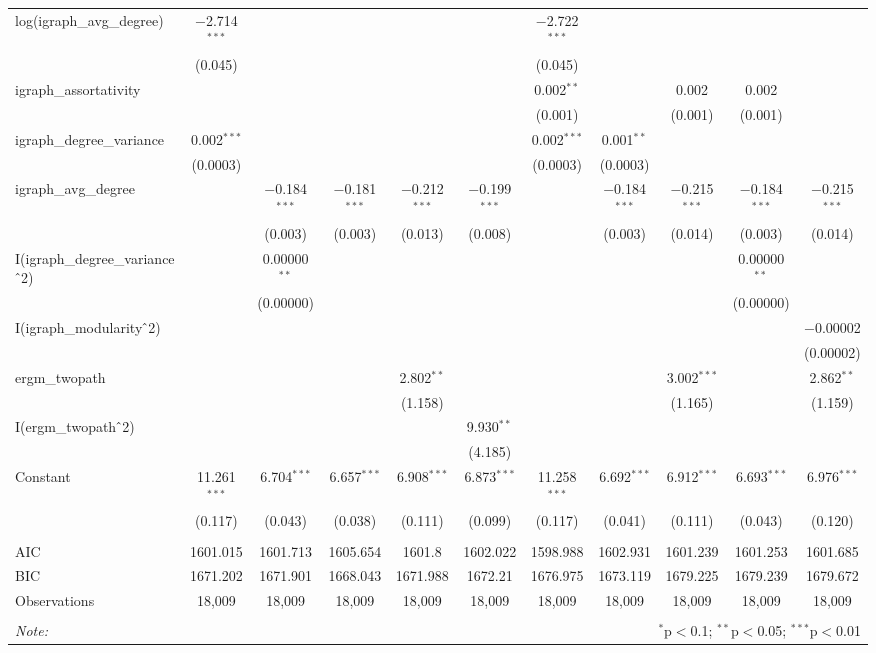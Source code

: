 \begin{table}[!htbp]
\begin{tabular}{@{\extracolsep{5pt}}lcccccccccc}
  log(igraph\_avg\_degree) & $-$2.714$^{***}$ &  &  &  &  & $-$2.722$^{***}$ &  &  &  &  \\ 
  & (0.045) &  &  &  &  & (0.045) &  &  &  &  \\ 
  igraph\_assortativity &  &  &  &  &  & 0.002$^{**}$ &  & 0.002 & 0.002 &  \\ 
  &  &  &  &  &  & (0.001) &  & (0.001) & (0.001) &  \\ 
  igraph\_degree\_variance & 0.002$^{***}$ &  &  &  &  & 0.002$^{***}$ & 0.001$^{**}$ &  &  &  \\ 
  & (0.0003) &  &  &  &  & (0.0003) & (0.0003) &  &  &  \\ 
  igraph\_avg\_degree &  & $-$0.184$^{***}$ & $-$0.181$^{***}$ & $-$0.212$^{***}$ & $-$0.199$^{***}$ &  & $-$0.184$^{***}$ & $-$0.215$^{***}$ & $-$0.184$^{***}$ & $-$0.215$^{***}$ \\ 
  &  & (0.003) & (0.003) & (0.013) & (0.008) &  & (0.003) & (0.014) & (0.003) & (0.014) \\ 
  I(igraph\_degree\_variance$\hat{\mkern6mu}$2) &  & 0.00000$^{**}$ &  &  &  &  &  &  & 0.00000$^{**}$ &  \\ 
  &  & (0.00000) &  &  &  &  &  &  & (0.00000) &  \\ 
  I(igraph\_modularity$\hat{\mkern6mu}$2) &  &  &  &  &  &  &  &  &  & $-$0.00002 \\ 
  &  &  &  &  &  &  &  &  &  & (0.00002) \\ 
  ergm\_twopath &  &  &  & 2.802$^{**}$ &  &  &  & 3.002$^{***}$ &  & 2.862$^{**}$ \\ 
  &  &  &  & (1.158) &  &  &  & (1.165) &  & (1.159) \\ 
  I(ergm\_twopath$\hat{\mkern6mu}$2) &  &  &  &  & 9.930$^{**}$ &  &  &  &  &  \\ 
  &  &  &  &  & (4.185) &  &  &  &  &  \\ 
  Constant & 11.261$^{***}$ & 6.704$^{***}$ & 6.657$^{***}$ & 6.908$^{***}$ & 6.873$^{***}$ & 11.258$^{***}$ & 6.692$^{***}$ & 6.912$^{***}$ & 6.693$^{***}$ & 6.976$^{***}$ \\ 
  & (0.117) & (0.043) & (0.038) & (0.111) & (0.099) & (0.117) & (0.041) & (0.111) & (0.043) & (0.120) \\ 
 \hline \\[-1.8ex] 
AIC & 1601.015 & 1601.713 & 1605.654 & 1601.8 & 1602.022 & 1598.988 & 1602.931 & 1601.239 & 1601.253 & 1601.685 \\ 
BIC & 1671.202 & 1671.901 & 1668.043 & 1671.988 & 1672.21 & 1676.975 & 1673.119 & 1679.225 & 1679.239 & 1679.672 \\ 
Observations & 18,009 & 18,009 & 18,009 & 18,009 & 18,009 & 18,009 & 18,009 & 18,009 & 18,009 & 18,009 \\ 
\hline 
\hline \\[-1.8ex] 
\textit{Note:}  & \multicolumn{10}{r}{$^{*}$p$<$0.1; $^{**}$p$<$0.05; $^{***}$p$<$0.01} \\ 
\end{tabular} 
\end{table} 
